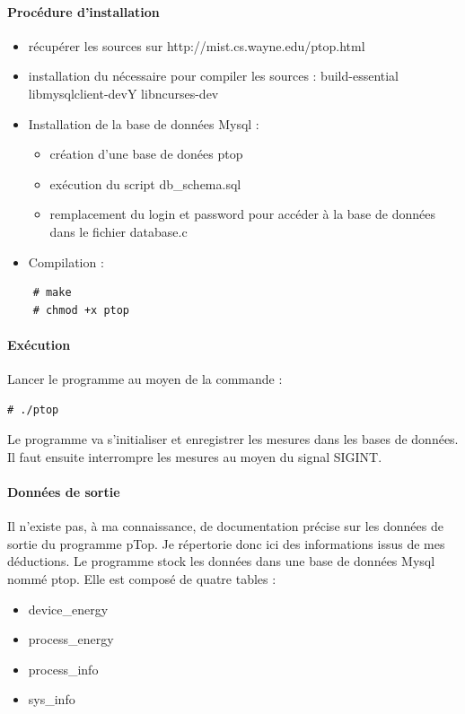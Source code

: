 \documentclass[a4paper, 11pt]{report}
\begin{document}
\paragraph{Procédure d'installation}
\begin{itemize}
	\item récupérer les sources sur http://mist.cs.wayne.edu/ptop.html
	\item installation du nécessaire pour compiler les sources : build-essential libmysqlclient-devY libncurses-dev
	\item Installation de la base de données Mysql :
	\begin{itemize}
		\item création d’une base de donées ptop
		\item exécution du script db\_schema.sql
		\item remplacement du login et password pour accéder à la base de données dans le fichier database.c
	\end{itemize}
	\item Compilation :

\end{itemize}
\begin{verbatim}
	# make
	# chmod +x ptop
\end{verbatim}

\paragraph{Exécution}
Lancer le programme au moyen de la commande :

\begin{verbatim}
# ./ptop
\end{verbatim}

Le programme va s'initialiser et enregistrer les mesures dans les bases de données. Il faut ensuite interrompre les mesures au moyen du signal SIGINT.

\paragraph{Données de sortie}
Il n’existe pas, à ma connaissance, de documentation précise sur les données de sortie du programme pTop. Je répertorie donc ici des informations issus de mes déductions. Le programme stock les données dans une base de données Mysql nommé ptop. Elle est composé de quatre tables :
\begin{itemize}
	\item device\_energy
	\item process\_energy
	\item process\_info
	\item sys\_info
\end{itemize}
\end{document}
